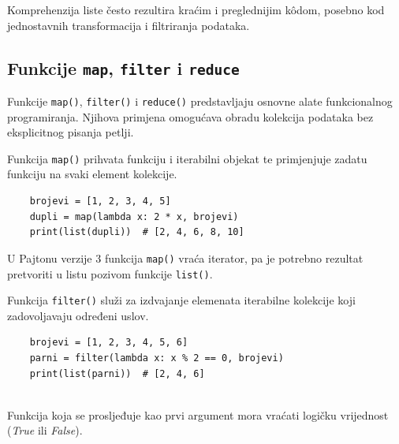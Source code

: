 Komprehenzija liste često rezultira kraćim i preglednijim k\^odom, posebno kod jednostavnih transformacija i filtriranja podataka.

\subsection{Funkcije \texttt{map}, \texttt{filter} i \texttt{reduce}}

Funkcije \texttt{map()}, \texttt{filter()} i \texttt{reduce()} predstavljaju osnovne alate funkcionalnog programiranja. Njihova primjena omogućava obradu kolekcija podataka bez eksplicitnog pisanja petlji.


Funkcija \texttt{map()} prihvata funkciju i iterabilni objekat te primjenjuje zadatu funkciju na svaki element kolekcije.

\begin{verbatim}
	brojevi = [1, 2, 3, 4, 5]
	dupli = map(lambda x: 2 * x, brojevi)
	print(list(dupli)) 	# [2, 4, 6, 8, 10]
\end{verbatim}

U Pajtonu verzije 3 funkcija \texttt{map()} vraća iterator, pa je potrebno rezultat pretvoriti u listu pozivom funkcije \texttt{list()}.


Funkcija \texttt{filter()} služi za izdvajanje elemenata iterabilne kolekcije koji zadovoljavaju određeni uslov.

\begin{verbatim}
	brojevi = [1, 2, 3, 4, 5, 6]	
	parni = filter(lambda x: x % 2 == 0, brojevi)
	print(list(parni))  # [2, 4, 6]
	
\end{verbatim}

Funkcija koja se prosljeđuje kao prvi argument mora vraćati logičku vrijednost (\textit{True} ili \textit{False}).


